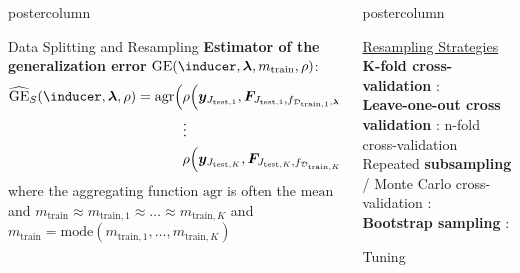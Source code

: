 \documentclass{beamer}
\newlength{\columnheight} %
\begin{document}
\begin{frame}[fragile]{}
\begin{columns}
\begin{column}{.31\textwidth}
\begin{beamercolorbox}[center]{postercolumn}
\begin{minipage}{.98\textwidth}
{\begin{myblock}{Data Splitting and Resampling}
\textbf{Estimator of the generalization error} $\mathrm{GE}(\inducer, \bm{\lambda}, m_\mathrm{train}, \rho)$:
\begin{equation*}
\begin{split}
\widehat{\mathrm{GE}}_S(\inducer, \boldsymbol\lambda, \rho) = \mathrm{agr}\Big(
 &\rho\Big(\boldsymbol{y}_{J_{\mathrm{test},1}}, \boldsymbol{F}_{J_{\mathrm{test},1},f_{\mathcal{D}_{\mathrm{train},1}, \boldsymbol\lambda}}\Big), \\ &\large{\vdots} \\
& \rho\Big(\boldsymbol{y}_{J_{\mathrm{test},K}}, \boldsymbol{F}_{J_{\mathrm{test},K},
f_{\mathcal{D}_{\mathrm{train},K}, \boldsymbol\lambda}}\Big)
    \Big),
\end{split}
\end{equation*}
where the aggregating function $\mathrm{agr}$ is often the $\textrm{mean}$ and
$m_{\mathrm{train}} \approx m_{\mathrm{train},1} \approx \dots \approx m_{\mathrm{train},K}$ and $m_{\mathrm{train}} = \mathrm{mode}(m_{\mathrm{train},1}, \dots, m_{\mathrm{train},K})$
\end{myblock}
\vfill
				}
			\end{minipage}
		\end{beamercolorbox}
	\end{column}
	\begin{column}{.31\textwidth}
		\begin{beamercolorbox}[center]{postercolumn}
			\begin{minipage}{.98\textwidth}
				\parbox[t][\columnheight]{\textwidth}{
\underline{Resampling Strategies}\\

\textbf{K-fold cross-validation} :\\ 

\textbf{Leave-one-out cross validation}  : n-fold cross-validation\\

Repeated \textbf{subsampling} / Monte Carlo cross-validation :\\ 

\textbf{Bootstrap sampling} : \\ 

\begin{myblock}{Tuning}


\end{myblock}}
\end{minipage}
\end{beamercolorbox}
\end{column}
\end{columns}
\end{frame}
\end{document}
